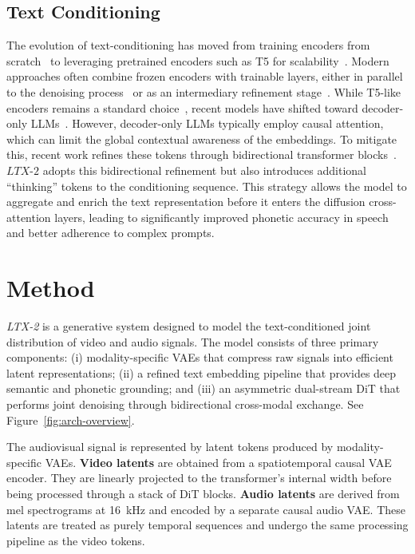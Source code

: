 \documentclass{article}
\begin{document}
\subsection{Text Conditioning}

The evolution of text-conditioning has moved from training encoders from scratch~\cite{glide2022} to leveraging pretrained encoders such as T5 for scalability~\cite{imagen2022}. Modern approaches often combine frozen encoders with trainable layers, either in parallel to the denoising process~\cite{esser2024scaling, fibo2025} or as an intermediary refinement stage~\cite{kong2024hunyuanvideo}. While T5-like encoders remains a standard choice~\cite{veo32025}, recent models have shifted toward decoder-only LLMs~\cite{sana2024, lumina2024}. However, decoder-only LLMs typically employ causal attention, which can limit the global contextual awareness of the embeddings. To mitigate this, recent work refines these tokens through bidirectional transformer blocks~\cite{kong2024hunyuanvideo}. $\textit{LTX-2}$ adopts this bidirectional refinement but also introduces additional ``thinking'' tokens to the conditioning sequence. This strategy allows the model to aggregate and enrich the text representation before it enters the diffusion cross-attention layers, leading to significantly improved phonetic accuracy in speech and better adherence to complex prompts.

\section{Method}

\textit{LTX-2} is a generative system designed to model the text-conditioned joint distribution of video and audio signals. The model consists of three primary components: (i) modality-specific VAEs that compress raw signals into efficient latent representations; (ii) a refined text embedding pipeline that provides deep semantic and phonetic grounding; and (iii) an asymmetric dual-stream DiT that performs joint denoising through bidirectional cross-modal exchange. See Figure~\ref{fig:arch-overview}.

The audiovisual signal is represented by latent tokens produced by modality-specific VAEs.
\textbf{Video latents} are obtained from a spatiotemporal causal VAE encoder. They are linearly projected to the transformer’s internal width before being processed through a stack of DiT blocks.
\textbf{Audio latents} are derived from mel spectrograms at 16~kHz and encoded by a separate causal audio VAE. These latents are treated as purely temporal sequences and undergo the same processing pipeline as the video tokens.
\end{document}
